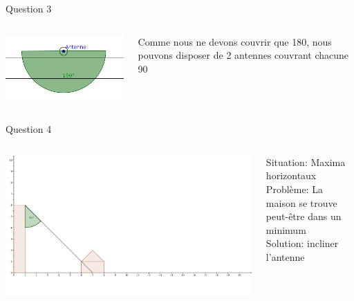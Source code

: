 \documentclass{beamer}
\begin{document}
\begin{frame}{Question 3}
	\begin{columns}
		\begin{column}{0.40\textwidth}
			\begin{center}
	    		\includegraphics[scale=0.9]{question3-2.png}
        		\end{center}
        	\end{column}
        	\begin{column}{0.40\textwidth}
	    Comme nous ne devons couvrir que \unit{180}{\degree}, nous pouvons disposer de 2 antennes couvrant chacune \unit{90}{\degree}
	   
        	\end{column}
        	\end{columns}
\end{frame}

\begin{frame}{Question 4}
	\begin{columns}
		\begin{column}{0.40\textwidth}
			\begin{center}
	    		\includegraphics[scale=0.5]{maison.png}
        			\end{center}
        		\end{column}
        		\begin{column}{0.40\textwidth}
	    	Situation: Maxima horizontaux
		\\Problème: La maison se trouve peut-être dans un minimum
		\\Solution: incliner l'antenne
        		\end{column}
        	\end{columns}
\end{frame}
\end{document}
